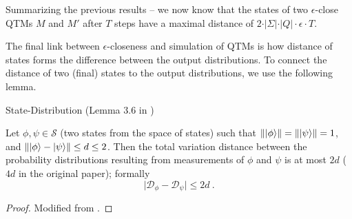 \begin{corollary}
Summarizing the previous results -- we now know that the states of two $\epsilon$-close \acp{QTM} $M$ and $M'$ after $T$ steps have a maximal distance of $2\cdot\vert\Sigma\vert\cdot\vert Q\vert\cdot\epsilon\cdot T$.
\end{corollary}

The final link between $\epsilon$-closeness and simulation of \acp{QTM} is how distance of states forms the difference between the output distributions.
To connect the distance of two (final) states to the output distributions, we use the following lemma.
\begin{lemma}
\label{lemma:statedist}
State-Distribution (Lemma 3.6 in \cite{bernstein_vazirani_1997})

Let $\phi,\psi\in\mathcal{S}$ (two states from the space of states) such that $\left\lVert\ket{\phi}\right\rVert=\left\lVert\ket{\psi}\right\rVert=1$, and $\left\lVert\ket{\phi}-\ket{\psi}\right\rVert\leq d\leq 2$. Then the total variation distance between the probability distributions resulting from measurements of $\phi$ and $\psi$ is at most $2d$ ($4d$ in the original paper); formally
\begin{equation}
    \vert\mathcal{D}_\phi-\mathcal{D}_\psi\vert\leq 2d
    \ .
\end{equation}

\begin{proof}
Modified from \cite{bernstein_vazirani_1997}.


\end{proof}
\end{lemma}
